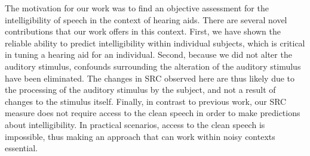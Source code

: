 \documentclass[10pt,letterpaper]{article}
\begin{document}
  The motivation for our work was to find an objective assessment for the 
  intelligibility of speech in the context of hearing aids. There are several
  novel contributions that our work offers in this context. First, we have 
  shown the reliable ability to predict intelligibility within individual 
  subjects, which is critical in tuning a hearing aid for an individual. 
  Second, because we did not alter the auditory stimulus, confounds surrounding
  the alteration of the auditory stimulus have been eliminated. The changes 
  in SRC observed here are thus likely due to the processing of the auditory
  stimulus by the subject, and not a result of changes to the stimulus itself.
  Finally, in contrast to previous work, our SRC measure does not require
  access to the clean speech in order to make predictions about intelligibility.
  In practical scenarios, access to the clean speech is impossible, thus making
  an approach that can work within noisy contexts essential.




\setlength{\bibleftmargin}{.125in}
\setlength{\bibindent}{-\bibleftmargin}


\end{document}
